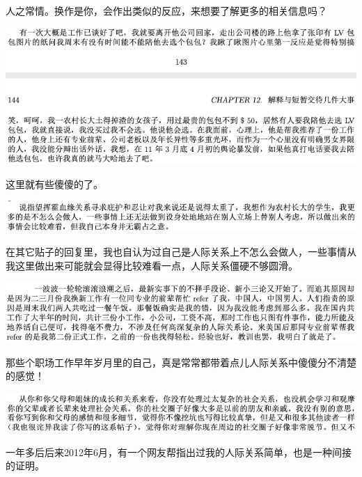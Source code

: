\documentclass[9pt, b5paper]{article}
\begin{document}
人之常情。换作是你，会作出类似的反应，来想要了解更多的相关信息吗？

\begin{center}
\includegraphics[width=.9\linewidth]{./pic/backups_plans_20210412_104740.png}
\end{center}

这里就有些傻傻的了。

\begin{center}
\includegraphics[width=.9\linewidth]{./pic/backups_plans_20210412_114004.png}
\end{center}

在其它贴子的回复里，我也自认为过自己是人际关系上不怎么会做人，一些事情从我这里做出来可能就会显得比较难看一点，人际关系僵硬不够圆滑。

\begin{center}
\includegraphics[width=.9\linewidth]{./pic/backups_plans_20210412_114144.png}
\end{center}

那些个职场工作早年岁月里的自己，真是常常都带着点儿人际关系中傻傻分不清楚的感觉！

\begin{center}
\includegraphics[width=.9\linewidth]{./pic/backups_plans_20210412_114502.png}
\end{center}

一年多后后来2012年6月，有一个网友帮指出过我的人际关系简单，也是一种间接的证明。 
\end{document}
